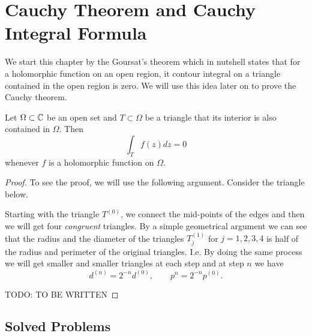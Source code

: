 \chapter{Cauchy Theorem and Cauchy Integral Formula}

We start this chapter by the Goursat's theorem which in nutshell states that for a holomorphic function on an open region, it contour integral on a triangle contained in the open region is zero. We will use this idea later on to prove the Cauchy theorem.


\begin{theorem}
	Let $ \Omega \subset \mathbb{C} $ be an open set and $ T \subset \Omega $ be a triangle that its interior is also contained in $ \Omega $. Then 
	\[ \int_T f(z) dz = 0 \]
	whenever $ f $ is a holomorphic function on $ \Omega $.
\end{theorem}

\begin{proof}
	To see the proof, we will use the following argument. Consider the triangle below.
	
	Starting with the triangle $ T^(0) $, we connect the mid-points of the edges and then we will get four \emph{congruent} triangles. By a simple geometrical argument we can see that the radius and the diameter of the triangles $ T^(1)_j $ for $ j=1,2,3,4 $ is half of the radius and perimeter of the original triangles. I.e. By doing the same process we will get smaller and smaller triangles at each step and at step $ n $ we have
	\[ d^(n) = 2^{-n} d^{(0)}, \qquad p^{n} = 2^{-n}p^{(0)}. \]
	
	{\color{red} \noindent TODO: TO BE WRITTEN}
	
\end{proof}



\section{Solved Problems}

